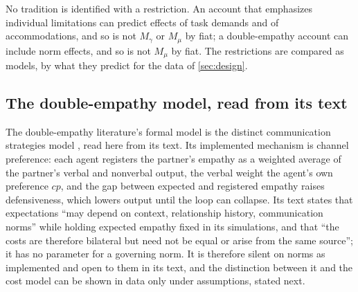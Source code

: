 \noindent No tradition is identified with a restriction. An account that emphasizes individual limitations can predict effects of task demands and of accommodations, and so is not $M_\gamma$ or $M_\mu$ by fiat; a double-empathy account can include norm effects, and so is not $M_\mu$ by fiat. The restrictions are compared as models, by what they predict for the data of \autoref{sec:design}.

\subsection{The double-empathy model, read from its text}

The double-empathy literature's formal model is the distinct communication strategies model \cite{Calderoli2026}, read here from its text. Its implemented mechanism is channel preference: each agent registers the partner's empathy as a weighted average of the partner's verbal and nonverbal output, the verbal weight the agent's own preference $cp$, and the gap between expected and registered empathy raises defensiveness, which lowers output until the loop can collapse. Its text states that expectations ``may depend on context, relationship history, communication norms'' while holding expected empathy fixed in its simulations, and that ``the costs are therefore bilateral but need not be equal or arise from the same source''; it has no parameter for a governing norm. It is therefore silent on norms as implemented and open to them in its text, and the distinction between it and the cost model can be shown in data only under assumptions, stated next.

